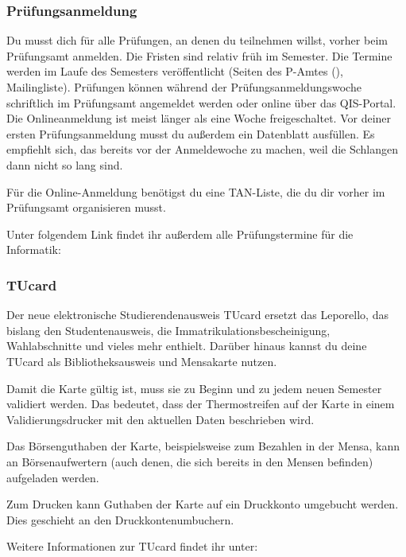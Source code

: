 \begin{multicols}{2}
\subsubsection{Prüfungsanmeldung}
	\label{todoanmeldung}

	Du musst dich für alle Prüfungen, an denen du teilnehmen willst, vorher beim Prüfungsamt anmelden. Die Fristen sind relativ früh im Semester. Die Termine werden im Laufe des Semesters veröffentlicht (Seiten des P-Amtes (), Mailingliste). Prüfungen können während der Prüfungsanmeldungswoche schriftlich im Prüfungsamt angemeldet werden oder online über das QIS-Portal. Die Onlineanmeldung ist meist länger als eine Woche freigeschaltet.
	Vor deiner ersten Prüfungsanmeldung musst du außerdem ein Datenblatt ausfüllen. Es empfiehlt sich, das bereits vor der Anmeldewoche zu machen, weil die Schlangen dann nicht so lang sind.

	Für die Online-Anmeldung benötigst du eine TAN-Liste, die du dir vorher im Prüfungsamt organisieren musst.

	Unter folgendem Link findet ihr außerdem alle Prüfungstermine für die Informatik: 

\subsubsection{TUcard}
	\label{tucard}
	
	Der neue elektronische Studierendenausweis TUcard ersetzt das Leporello, das bislang den Studentenausweis, die Immatrikulationsbescheinigung, Wahlabschnitte und vieles mehr enthielt. Darüber hinaus kannst du deine TUcard als Bibliotheksausweis und Mensakarte nutzen.

	Damit die Karte gültig ist, muss sie zu Beginn und zu jedem neuen Semester validiert werden. Das bedeutet, dass der Thermostreifen auf der Karte in einem Validierungsdrucker mit den aktuellen Daten beschrieben wird.

	Das Börsenguthaben der Karte, beispielsweise zum Bezahlen in der Mensa, kann an Börsenaufwertern (auch denen, die sich bereits in den Mensen befinden) aufgeladen werden.

	Zum Drucken kann Guthaben der Karte auf ein Druckkonto umgebucht werden. Dies geschieht an den Druckkontenumbuchern.

	Weitere Informationen zur TUcard findet ihr unter: 


\end{multicols}
